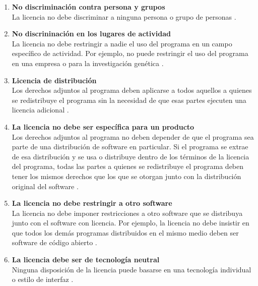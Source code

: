 \begin{spacing}{1.5}
\begin{enumerate}
			\item \textbf{No discriminaci\'{o}n contra persona y grupos}\\
			La licencia no debe discriminar a ninguna persona o grupo de personas \cite{chap2_open_source}.
			
			\item \textbf{No discrininaci\'{o}n en los lugares de actividad}\\
			La licencia no debe restringir a nadie el uso del programa en un campo específico de actividad. Por ejemplo, no puede restringir el uso del programa en una empresa o para la investigación genética \cite{chap2_open_source}.
			
			\item \textbf{Licencia de distribuci\'{o}n}\\
			Los derechos adjuntos al programa deben aplicarse a todos aquellos a quienes se redistribuye el programa sin la necesidad de que esas partes ejecuten una licencia adicional \cite{chap2_open_source}.
			
			\item \textbf{La licencia no debe ser espec\'{i}fica para un producto}\\
			Los derechos adjuntos al programa no deben depender de que el programa sea parte de una distribución de software en particular. Si el programa se extrae de esa distribución y se usa o distribuye dentro de los términos de la licencia del programa, todas las partes a quienes se redistribuye el programa deben tener los mismos derechos que los que se otorgan junto con la distribución original del software \cite{chap2_open_source}.
			
			\item \textbf{La licencia no debe restringir a otro software}\\
			La licencia no debe imponer restricciones a otro software que se distribuya junto con el software con licencia. Por ejemplo, la licencia no debe insistir en que todos los demás programas distribuidos en el mismo medio deben ser software de código abierto \cite{chap2_open_source}.
			
			\item \textbf{La licencia debe ser de tecnología neutral}\\
			Ninguna disposición de la licencia puede basarse en una tecnología individual o estilo de interfaz \cite{chap2_open_source}.
			
		\end{enumerate}
	

\end{spacing}
